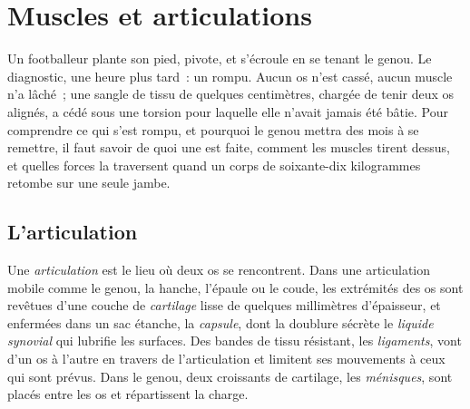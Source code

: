 \chapter{Muscles et articulations}\label{ch:g10:muscles-and-joints}

Un footballeur plante son pied, pivote, et s'écroule en se tenant le
genou. Le diagnostic, une heure plus tard~: un  rompu. Aucun os
n'est cassé, aucun muscle n'a lâché~; une sangle de tissu de quelques
centimètres, chargée de tenir deux os alignés, a cédé sous une torsion
pour laquelle elle n'avait jamais été bâtie. Pour comprendre ce qui
s'est rompu, et pourquoi le genou mettra des mois à se remettre, il
faut savoir de quoi une  est faite, comment les muscles
tirent dessus, et quelles forces la traversent quand un corps de
soixante-dix kilogrammes retombe sur une seule jambe.

\section{L'articulation}

\begin{definition}[Articulation]\label{def:g10:muscles-and-joints:joint}
Une \emph{articulation} est le lieu où deux os se
rencontrent. Dans une articulation mobile comme le genou, la hanche,
l'épaule ou le coude, les extrémités des os sont revêtues d'une couche
de \emph{cartilage} lisse de quelques millimètres
d'épaisseur, et enfermées dans un sac étanche, la \emph{capsule}, dont
la doublure sécrète le \emph{liquide synovial} qui lubrifie les
surfaces. Des bandes de tissu résistant, les
\emph{ligaments}, vont d'un os à l'autre en travers de
l'articulation et limitent ses mouvements à ceux qui sont prévus. Dans
le genou, deux croissants de cartilage, les \emph{ménisques}, sont
placés entre les os et répartissent la charge.
\end{definition}

